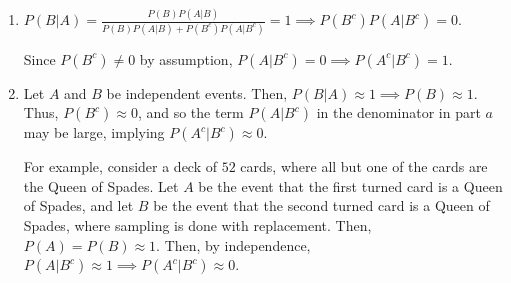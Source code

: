 \begin{enumerate}[label=(\alph*)]

\item 
$P(B|A) = \frac{P(B)P(A|B)}{P(B)P(A|B) + P(B^{c})P(A|B^{c})} = 1 
\implies P(B^{c})P(A|B^{c}) = 0$.

Since $P(B^{c}) \neq 0$ by assumption, $P(A|B^{c}) = 0 
\implies P(A^{c}|B^{c}) = 1$.

\item Let $A$ and $B$ be independent events. 
Then, $P(B|A) \approx 1 \implies P(B) \approx 1$.
Thus, $P(B^{c}) \approx 0$, and so the term $P(A|B^{c})$ in the denominator in 
part $a$ may be large,
implying $P(A^{c}|B^{c}) \approx 0$.

For example, consider a deck of $52$ cards, where all but one of the cards are 
the Queen of Spades.
Let $A$ be the event that the first turned card is a Queen of Spades, 
and let $B$ be the event that the second turned card is a Queen of Spades, where
sampling is done with replacement. Then, $P(A) = P(B) \approx 1$.
Then, by independence, $P(A|B^{c}) \approx 1 \implies P(A^{c}|B^{c}) \approx 0$.
\end{enumerate}